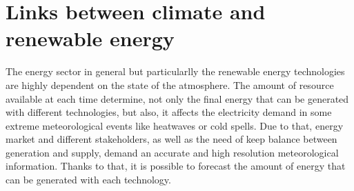 






\section{Links between climate and renewable energy}


The energy sector in general but particularlly the renewable energy technologies are highly dependent on the state of the atmosphere. The amount of resource available at each time determine, not only the final energy that can be generated with different technologies, but also, it affects the electricity demand in some extreme meteorological events like heatwaves or cold spells. Due to that, energy market and different stakeholders, as well as the need of keep balance between generation and supply, demand an accurate and high resolution meteorological information. Thanks to that, it is possible to forecast the amount of energy that can be generated with each technology. 

